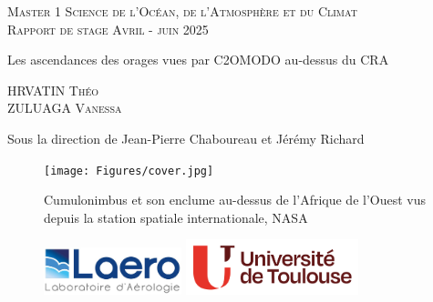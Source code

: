 \documentclass[12pt]{article}
\begin{document}
\begin{titlepage}

\begin{center}

    \textsc{\LARGE Master 1 Science de l'Océan, de l'Atmosphère et du Climat \\ \vskip1.5cm Rapport de stage}
    \vskip0.4cm
    \textsc{\Large Avril - juin 2025}
\end{center}
\vspace{0.1cm}
\begin{tcolorbox}[
    enhanced,
    width=\textwidth, %
    height=3.5cm,
    fontupper=\large\bfseries,
    drop fuzzy shadow,
    valign=center,
    colback=white,
    colframe=black,
    boxrule=1.5mm,
    halign=center %
]
\LARGE Les ascendances des orages vues par C2OMODO au-dessus du CRA
\end{tcolorbox}


\begin{center}

\vspace{0.5cm}
\begin{minipage}{0.45\textwidth}
    \begin{center}\large
        \textsc{HRVATIN Théo} \\
        \textsc{ZULUAGA Vanessa} \\
    \end{center}
\end{minipage}
\vskip 0.75cm
\Large{Sous la direction de Jean-Pierre Chaboureau et Jérémy Richard}
\end{center}

\begin{center}
    \begin{figure}[h!]
        \centering
        \texttt{[image: Figures/cover.jpg]}
        \caption*{Cumulonimbus et son enclume au-dessus de l'Afrique de l'Ouest vus depuis la station spatiale internationale, \textcopyright NASA}
    \end{figure}
\end{center}


\begin{center}
\begin{figure}[!h] 
	\centering 
	\begin{minipage}[t]{4cm} 
		\centering 
		\includegraphics[width = 4cm]{Figures/laero_logo.jpg}  
	\end{minipage} 
	\hspace{3cm} 
	\begin{minipage}[t]{4cm} 
		\centering 
		\includegraphics[width=5cm]{Figures/logo-UT-site.png} 
	\end{minipage}
\end{figure}
\end{center}

\end{titlepage}
\end{document}
